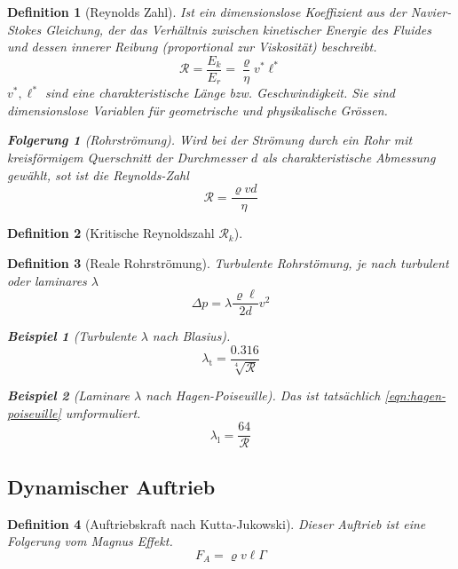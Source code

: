 \documentclass[a4paper, twocolumn]{article}
\numberwithin{equation}{section}
\theoremstyle{hsr-def}
\newtheorem{definition}{Definition}[section]
\theoremstyle{hsr-sub}
\newtheorem{result}{Folgerung}[definition]
\newtheorem{example}{Beispiel}[definition]
\begin{document}
\begin{definition}[Reynolds Zahl]
Ist ein dimensionslose Koeffizient aus der \emph{Navier-Stokes} Gleichung, der das Verh\"altnis zwischen kinetischer Energie des Fluides und dessen innerer Reibung (proportional zur Viskosit\"at) beschreibt.
\[
    \mathcal{R} = \frac{E_k}{E_r} = \frac{\varrho}{\eta} v^*\ell^*
\]
\(v^*, \ell^*\) sind eine charakteristische L\"ange bzw. Geschwindigkeit. Sie sind dimensionslose Variablen f\"ur geometrische und physikalische Gr\"ossen.

\begin{result}[Rohrstr\"omung]
Wird bei der Str\"omung durch ein Rohr mit kreisf\"ormigem Querschnitt der Durchmesser \(d\) als charakteristische Abmessung gew\"ahlt, sot ist die Reynolds-Zahl
\[
    \mathcal{R} = \frac{\varrho v d}{\eta}
\]
\end{result}

\end{definition}

\begin{definition}[Kritische Reynoldszahl \(\mathcal{R}_k\)]

\end{definition}

\begin{definition}[Reale Rohrstr\"omung]
Turbulente Rohrst\"omung, je nach turbulent oder laminares \(\lambda\) 
\[
    \Delta p = \lambda \frac{\varrho\ell}{2d} v^2
\]

\begin{example}[Turbulente \(\lambda\) nach Blasius]
\[
    \lambda_\text{t} = \frac{0.316}{\sqrt[4]{\mathcal{R}}}
\]
\end{example}

\begin{example}[Laminare \(\lambda\) nach Hagen-Poiseuille]
Das ist tats\"achlich \eqref{eqn:hagen-poiseuille} umformuliert.
\[
    \lambda_\text{l} = \frac{64}{\mathcal{R}}
\]
\end{example}
\end{definition}

\subsection{Dynamischer Auftrieb}
\begin{definition}[Auftriebskraft nach Kutta-Jukowski] Dieser Auftrieb ist eine Folgerung vom \emph{Magnus Effekt}.
\[
    F_A = \varrho v \ell \Gamma
\]
\end{definition}
\end{document}
